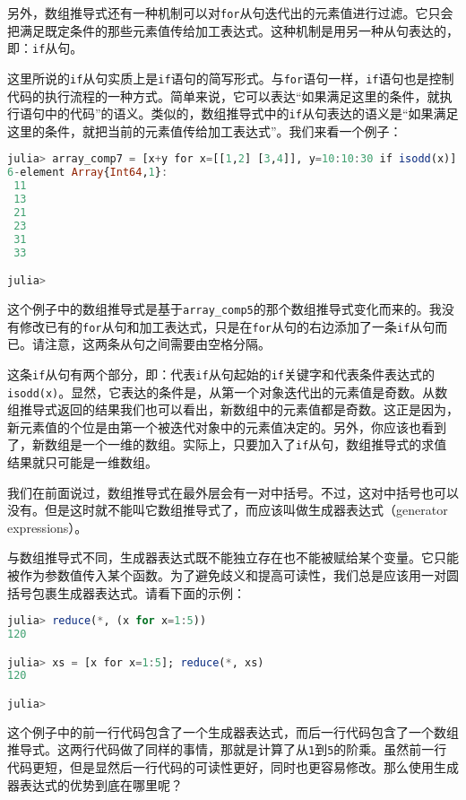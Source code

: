 另外，数组推导式还有一种机制可以对\verb|for|从句迭代出的元素值进行过滤。它只会把满足既定条件的那些元素值传给加工表达式。这种机制是用另一种从句表达的，即：\verb|if|从句。

这里所说的\verb|if|从句实质上是\verb|if|语句的简写形式。与\verb|for|语句一样，\verb|if|语句也是控制代码的执行流程的一种方式。简单来说，它可以表达“如果满足这里的条件，就执行语句中的代码”的语义。类似的，数组推导式中的\verb|if|从句表达的语义是“如果满足这里的条件，就把当前的元素值传给加工表达式”。我们来看一个例子：

\begin{lstlisting}[language=julia]
julia> array_comp7 = [x+y for x=[[1,2] [3,4]], y=10:10:30 if isodd(x)]
6-element Array{Int64,1}:
 11
 13
 21
 23
 31
 33

julia>
\end{lstlisting}

这个例子中的数组推导式是基于\verb|array_comp5|的那个数组推导式变化而来的。我没有修改已有的\verb|for|从句和加工表达式，只是在\verb|for|从句的右边添加了一条\verb|if|从句而已。请注意，这两条从句之间需要由空格分隔。

这条\verb|if|从句有两个部分，即：代表\verb|if|从句起始的\verb|if|关键字和代表条件表达式的\verb|isodd(x)|。显然，它表达的条件是，从第一个对象迭代出的元素值是奇数。从数组推导式返回的结果我们也可以看出，新数组中的元素值都是奇数。这正是因为，新元素值的个位是由第一个被迭代对象中的元素值决定的。另外，你应该也看到了，新数组是一个一维的数组。实际上，只要加入了\verb|if|从句，数组推导式的求值结果就只可能是一维数组。

我们在前面说过，数组推导式在最外层会有一对中括号。不过，这对中括号也可以没有。但是这时就不能叫它数组推导式了，而应该叫做生成器表达式（generator expressions）。

与数组推导式不同，生成器表达式既不能独立存在也不能被赋给某个变量。它只能被作为参数值传入某个函数。为了避免歧义和提高可读性，我们总是应该用一对圆括号包裹生成器表达式。请看下面的示例：

\begin{lstlisting}[language=julia]
julia> reduce(*, (x for x=1:5))
120

julia> xs = [x for x=1:5]; reduce(*, xs)
120

julia> 
\end{lstlisting}

这个例子中的前一行代码包含了一个生成器表达式，而后一行代码包含了一个数组推导式。这两行代码做了同样的事情，那就是计算了从\verb|1|到\verb|5|的阶乘。虽然前一行代码更短，但是显然后一行代码的可读性更好，同时也更容易修改。那么使用生成器表达式的优势到底在哪里呢？


